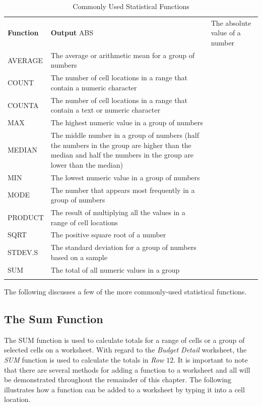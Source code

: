 \begin{table}[H]
	{\small
		\begin{longtable}{L{0.75in}L{3.50in}} %
			\textbf{Function} & \textbf{Output} \endhead
			\hline
			ABS & The absolute value of a number\\
			AVERAGE & The average or arithmetic mean for a group of numbers\\
			COUNT & The number of cell locations in a range that contain a numeric character\\
			COUNTA & The number of cell locations in a range that contain a text or numeric character\\
			MAX & The highest numeric value in a group of numbers\\
			MEDIAN & The middle number in a group of numbers (half the numbers in the group are higher than the median and half the numbers in the group are lower than the median)\\
			MIN & The lowest numeric value in a group of numbers\\
			MODE & The number that appears most frequently in a group of numbers\\
			PRODUCT & The result of multiplying all the values in a range of cell locations\\
			SQRT & The positive square root of a number\\
			STDEV.S & The standard deviation for a group of numbers based on a sample\\
			SUM & The total of all numeric values in a group\\
			\caption{Commonly Used Statistical Functions}
			\label{02:tab04}
		\end{longtable}
	} %
\end{table}

The following discusses a few of the more commonly-used statistical functions.

\subsection{The Sum Function}

The SUM function is used to calculate totals for a range of cells or a group of selected cells on a worksheet. With regard to the \textit{Budget Detail} worksheet, the \textit{SUM} function is used to calculate the totals in \textit{Row $ 12 $}. It is important to note that there are several methods for adding a function to a worksheet and all will be demonstrated throughout the remainder of this chapter. The following illustrates how a function can be added to a worksheet by typing it into a cell location.

